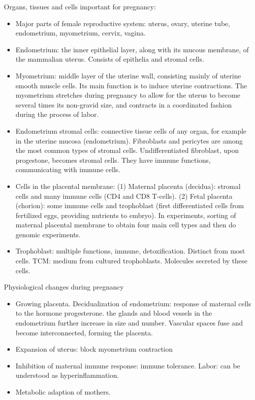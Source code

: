 \documentclass{report}
\begin{document}
Organs, tissues and cells important for pregnancy: 
\begin{itemize}
	\item Major parts of female reproductive system: uterus, ovary, uterine tube, endometrium, myometrium, cervix, vagina. 
	
	\item Endometrium: the inner epithelial layer, along with its mucous membrane, of the mammalian uterus. Consists of epithelia and stromal cells. 
	
	\item Myometrium: middle layer of the uterine wall, consisting mainly of uterine smooth muscle cells. Its main function is to induce uterine contractions. The myometrium stretches during pregnancy to allow for the uterus to become several times its non-gravid size, and contracts in a coordinated fashion during the process of labor. 
		
	\item Endometrium stromal cells: connective tissue cells of any organ, for example in the uterine mucosa (endometrium). Fibroblasts and pericytes are among the most common types of stromal cells. Undifferentiated fibroblast, upon progestone, becomes stromal cells. They have immune functions, communicating with immune cells. 
	
	\item Cells in the placental membrane: (1) Maternal placenta (decidua): stromal cells and many immune cells (CD4 and CD8 T-cells). (2) Fetal placenta (chorion): some immune cells and trophoblast (first differentiated cells from fertilized eggs, providing nutrients to embryo). In experiments, sorting of maternal placental membrane to obtain four main cell types and then do genomic experiments. 
	
	\item Trophoblast: multiple functions, immune, detoxification. Distinct from most cells. TCM: medium from cultured trophoblasts. Molecules secreted by these cells.
\end{itemize}

Physiological changes during pregnancy
\begin{itemize}
	\item Growing placenta. Decidualization of endometrium: response of maternal cells to the hormone progesterone. the glands and blood vessels in the endometrium further increase in size and number. Vascular spaces fuse and become interconnected, forming the placenta.  
	
	\item Expansion of uterus: block myometrium contraction
	
	\item Inhibition of maternal immune response: immune tolerance. Labor: can be understood as hyperinflammation.  
	
	\item Metabolic adaption of mothers. 
\end{itemize}
\end{document}
